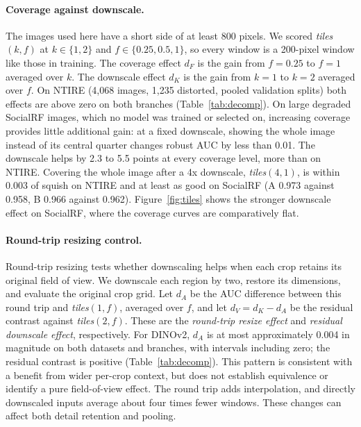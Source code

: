 \documentclass[letterpaper]{article} %
\begin{document}
\paragraph{Coverage against downscale.} The images used here have a short
side of at least 800 pixels. We scored \emph{tiles}$(k, f)$ at
$k \in \{1, 2\}$ and $f \in \{0.25, 0.5, 1\}$, so every window is a
200-pixel window like those in training. The coverage effect $d_F$ is the
gain from $f = 0.25$ to $f = 1$ averaged over $k$. The downscale effect $d_K$
is the gain from $k = 1$ to $k = 2$ averaged over $f$. On NTIRE (4,068 images,
1,235 distorted, pooled validation splits) both effects are above zero on both branches
(Table~\ref{tab:decomp}). On large degraded SocialRF images, which no model
was trained or selected on, increasing coverage provides little additional
gain: at a fixed downscale,
showing the whole image instead of its central quarter changes robust AUC by
less than 0.01. The downscale helps by 2.3 to 5.5 points at every coverage
level, more than on NTIRE. Covering the whole image after a 4x downscale,
\emph{tiles}$(4, 1)$, is within 0.003 of squish on NTIRE and at least as good
on SocialRF (A 0.973 against 0.958, B 0.966 against 0.962).
Figure~\ref{fig:tiles} shows the stronger downscale effect on SocialRF,
where the coverage curves are comparatively flat.

\paragraph{Round-trip resizing control.} Round-trip resizing tests whether
downscaling helps when each crop retains its original field of view. We
downscale each region by two, restore its dimensions, and evaluate the
original crop grid. Let $d_A$ be the AUC difference between this round trip
and \emph{tiles}$(1,f)$, averaged over $f$, and let $d_V=d_K-d_A$ be the
residual contrast against \emph{tiles}$(2,f)$. These are the
\emph{round-trip resize effect} and \emph{residual downscale effect},
respectively. For DINOv2, $d_A$ is at most approximately 0.004 in magnitude on both
datasets and branches, with intervals including zero; the residual
contrast is positive (Table~\ref{tab:decomp}). This pattern is consistent
with a benefit from wider per-crop context, but does not establish
equivalence or identify a pure field-of-view effect. The round trip adds
interpolation, and directly downscaled inputs average about four times
fewer windows. These changes can affect both detail retention and pooling.
\end{document}
